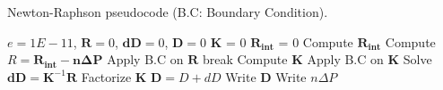 \documentclass{article}
\begin{document}
\begin{algorithm}[ht]
\caption{Newton-Raphson pseudocode (B.C: Boundary Condition).}
\begin{algorithmic} 
\ENSURE $e = 1E-11$, $\boldsymbol{R} = 0$, $\boldsymbol{dD} = 0$,  $\boldsymbol{D} = 0$
        \STATE $\boldsymbol{K}$ = 0
        \STATE $\boldsymbol{R_{int}}$ = 0
        \STATE Compute $\boldsymbol{R_{int}}$
        \STATE Compute $R = \boldsymbol{R_{int} - n \Delta P}$
        \STATE Apply B.C on $\boldsymbol{R}$
            \STATE break
        \ENDIF
        \STATE Compute $\boldsymbol{K}$
        \STATE Apply B.C on $\boldsymbol{K}$
        \STATE Solve $\boldsymbol{dD} = \boldsymbol{K}^{-1} \boldsymbol{R}$
        \STATE Factorize $\boldsymbol{K}$
        \STATE $\boldsymbol{D} = D + dD$
    \ENDFOR
    \STATE Write $\boldsymbol{D}$
    \STATE Write $n \Delta P$
\ENDFOR
\end{algorithmic}
\label{alg:nr}
\end{algorithm}
\end{document}
